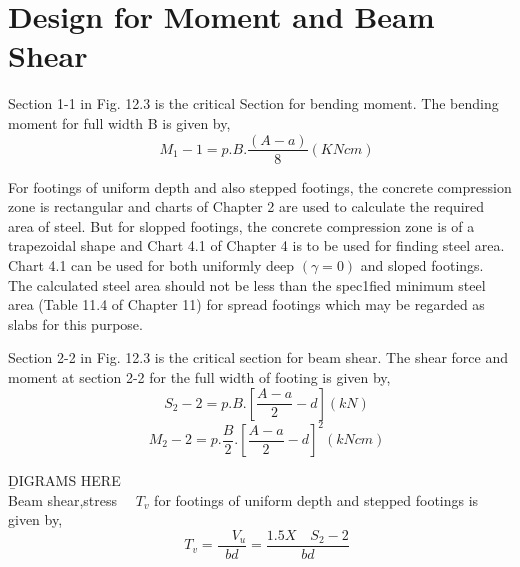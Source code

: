 \documentclass{book}
\begin{document}
 \section{Design for Moment and Beam Shear} 
 Section 1-1 in Fig. 12.3 is the critical  Section for bending moment. The bending moment
for full width B is given by,
\begin{equation}
\quad{M_1-1}=p.B.\frac{\left(A-a\right)}{8}(KN cm)
\end{equation}
\par For footings of uniform depth and also stepped footings, the concrete compression zone is
rectangular and charts of Chapter 2 are used to calculate the required area of steel. But for
slopped footings, the concrete compression zone is of a trapezoidal shape and Chart 4.1 of
Chapter 4 is to be used for ﬁnding steel area. Chart 4.1 can be used for both uniformly deep
$\left(\gamma = 0\right)$ and sloped footings. The calculated steel area should not be less than the spec1ﬁed minimum steel area (Table 11.4 of Chapter 11) for spread footings which may be regarded as slabs for this purpose. 
\par Section 2-2 in Fig. 12.3 is the critical section for beam shear. The shear force and moment
at section 2-2 for the full width of footing is given by,
\begin{equation}
\quad{S_2-2}=p.B.\left[\frac{A-a}{2}-d\right](kN)
\end{equation}
\begin{equation}
\quad{M_2-2}=p.\frac{B}{2}.\left[\frac{A-a}{2}-d\right]^2(kN cm)
\end{equation}

\newpage
\b DIGRAMS HERE\\
Beam shear,stress $\quad{T_v}$ for footings of uniform depth and stepped footings is given by,
\begin{equation}
\quad{T_v}=\frac{\quad{V_u}}{bd}=\frac{1.5X\quad{S_2-2}}{bd}
\end{equation}
\end{document}
